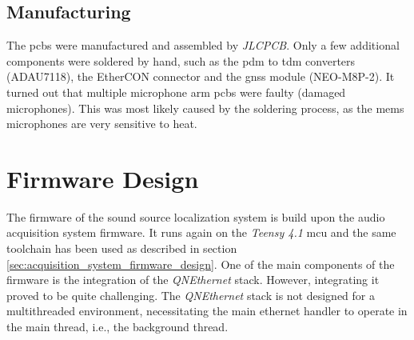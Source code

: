 \subsection{Manufacturing}
The \acrshort{pcb}s were manufactured and assembled by \textit{JLCPCB}.
Only a few additional components were soldered by hand, such as the \acrshort{pdm} to \acrshort{tdm} converters (ADAU7118), the EtherCON connector and the \acrshort{gnss} module (NEO-M8P-2).
It turned out that multiple microphone arm \acrshort{pcb}s were faulty (damaged microphones).
This was most likely caused by the soldering process, as the \acrshort{mems} microphones are very sensitive to heat.

\newpage
\section{Firmware Design}
The firmware of the sound source localization system is build upon the audio acquisition system firmware.
It runs again on the \textit{Teensy 4.1} \acrshort{mcu} and the same toolchain has been used as described in section \ref{sec:acquisition_system_firmware_design}.
One of the main components of the firmware is the integration of the \textit{QNEthernet} stack.
However, integrating it proved to be quite challenging.
The \textit{QNEthernet} stack is not designed for a multithreaded environment, necessitating the main ethernet handler to operate in the main thread, i.e., the background thread.

